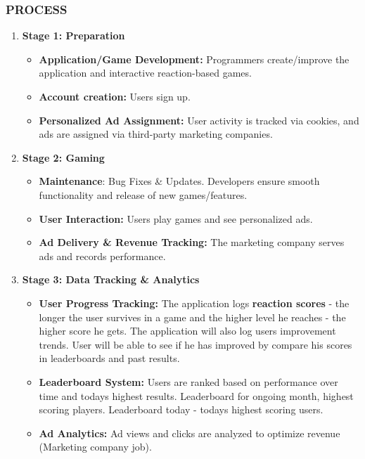 \documentclass[]{VUMIFTemplateClass}
\begin{document}
\subsubsection{PROCESS}
\begin{enumerate}
    \item \textbf{Stage 1: Preparation}
    \begin{itemize}
        \item \textbf{Application/Game Development:} Programmers create/improve the application and interactive reaction-based games.
        \item \textbf{Account creation:} Users sign up.
        \item \textbf{Personalized Ad Assignment:} User activity is tracked via cookies, and ads are assigned via third-party marketing companies.
    \end{itemize}
    \item \textbf{Stage 2: Gaming}
    \begin{itemize}
        \item \textbf{Maintenance}: Bug Fixes \& Updates. Developers ensure smooth functionality and release of new games/features.
        \item \textbf{User Interaction:} Users play games and see personalized ads.
        \item \textbf{Ad Delivery \& Revenue Tracking:} The marketing company serves ads and records performance.
    \end{itemize}
    \item \textbf{Stage 3: Data Tracking \& Analytics}
    \begin{itemize}
        \item \textbf{User Progress Tracking:} The application logs \label{sec:reactionScores}\textbf{reaction scores} - the longer the user survives in a game and the higher level he reaches - the higher score he gets. The application will also log users improvement trends. User will be able to see if he has improved by compare his scores in leaderboards and past results.
        \item \textbf{Leaderboard System:} Users are ranked based on performance over time and todays highest results. Leaderboard for ongoing month, highest scoring players. Leaderboard today - todays highest scoring users.
        \item \textbf{Ad Analytics:} Ad views and clicks are analyzed to optimize revenue (Marketing company job).
    \end{itemize}
\end{enumerate}
\end{document}
